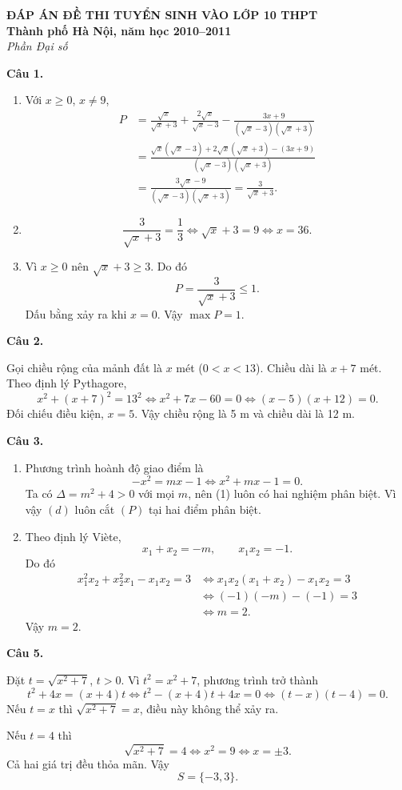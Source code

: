 \documentclass[12pt,a4paper]{article}
\begin{document}
\begin{center}
{\Large\bfseries ĐÁP ÁN ĐỀ THI TUYỂN SINH VÀO LỚP 10 THPT}\\
{\bfseries Thành phố Hà Nội, năm học 2010--2011}\\
{\itshape Phần Đại số}
\end{center}

\textbf{Câu 1.}
\begin{enumerate}[label=\alph*)]
\item Với $x\ge0$, $x\ne9$,
\begin{align*}
P&=\frac{\sqrt{x}}{\sqrt{x}+3}
+\frac{2\sqrt{x}}{\sqrt{x}-3}
-\frac{3x+9}{(\sqrt{x}-3)(\sqrt{x}+3)}\\
&=\frac{\sqrt{x}(\sqrt{x}-3)
+2\sqrt{x}(\sqrt{x}+3)-(3x+9)}
{(\sqrt{x}-3)(\sqrt{x}+3)}\\
&=\frac{3\sqrt{x}-9}{(\sqrt{x}-3)(\sqrt{x}+3)}
=\frac{3}{\sqrt{x}+3}.
\end{align*}

\item
\[
\frac{3}{\sqrt{x}+3}=\frac13
\Longleftrightarrow \sqrt{x}+3=9
\Longleftrightarrow x=36.
\]

\item Vì $x\ge0$ nên $\sqrt{x}+3\ge3$. Do đó
\[
P=\frac3{\sqrt{x}+3}\le1.
\]
Dấu bằng xảy ra khi $x=0$. Vậy $\boxed{\max P=1}$.
\end{enumerate}

\textbf{Câu 2.}

Gọi chiều rộng của mảnh đất là $x$ mét ($0<x<13$). Chiều dài là $x+7$ mét. Theo định lý Pythagore,
\[
x^2+(x+7)^2=13^2
\Longleftrightarrow x^2+7x-60=0
\Longleftrightarrow (x-5)(x+12)=0.
\]
Đối chiếu điều kiện, $x=5$. Vậy chiều rộng là 5 m và chiều dài là 12 m.

\textbf{Câu 3.}
\begin{enumerate}[label=\alph*)]
\item Phương trình hoành độ giao điểm là
\[
-x^2=mx-1
\Longleftrightarrow x^2+mx-1=0. \tag{1}
\]
Ta có $\Delta=m^2+4>0$ với mọi $m$, nên (1) luôn có hai nghiệm phân biệt. Vì vậy $(d)$ luôn cắt $(P)$ tại hai điểm phân biệt.

\item Theo định lý Viète,
\[
x_1+x_2=-m,\qquad x_1x_2=-1.
\]
Do đó
\begin{align*}
x_1^2x_2+x_2^2x_1-x_1x_2=3
&\Longleftrightarrow x_1x_2(x_1+x_2)-x_1x_2=3\\
&\Longleftrightarrow (-1)(-m)-(-1)=3\\
&\Longleftrightarrow m=2.
\end{align*}
Vậy $\boxed{m=2}$.
\end{enumerate}

\textbf{Câu 5.}

Đặt $t=\sqrt{x^2+7}$, $t>0$. Vì $t^2=x^2+7$, phương trình trở thành
\[
t^2+4x=(x+4)t
\Longleftrightarrow t^2-(x+4)t+4x=0
\Longleftrightarrow (t-x)(t-4)=0.
\]
Nếu $t=x$ thì $\sqrt{x^2+7}=x$, điều này không thể xảy ra.

Nếu $t=4$ thì
\[
\sqrt{x^2+7}=4
\Longleftrightarrow x^2=9
\Longleftrightarrow x=\pm3.
\]
Cả hai giá trị đều thỏa mãn. Vậy
\[
\boxed{S=\{-3,3\}}.
\]
\end{document}
